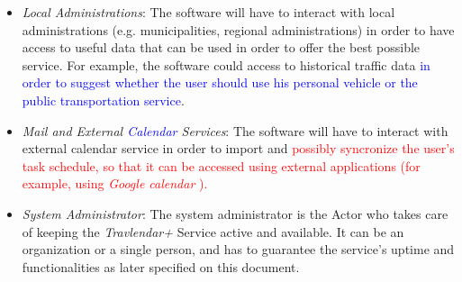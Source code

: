 \begin{itemize}
    \item \emph{Local Administrations}: The software will have to interact with local administrations (e.g. municipalities, regional administrations) in order to have access to useful data that can be used in order to offer the best possible service. For example, the software could access to historical traffic data \textcolor{blue}{in order to suggest whether the user should use his personal vehicle or the public transportation service}. 
    
    \item \emph{Mail and External \textcolor{blue}{Calendar} Services}: The software will have to interact with external calendar service in order to import and \textcolor{red}{possibly syncronize the user's task schedule, so that it can be accessed using external applications (for example, using \emph{Google calendar} ).}
    
    \item \emph{System Administrator}: The system administrator is the Actor who takes care of keeping the \emph{Travlendar+} Service active and available. It can be an organization or a single person, and has to guarantee the service's uptime and functionalities as later specified on this document.
\end{itemize}
